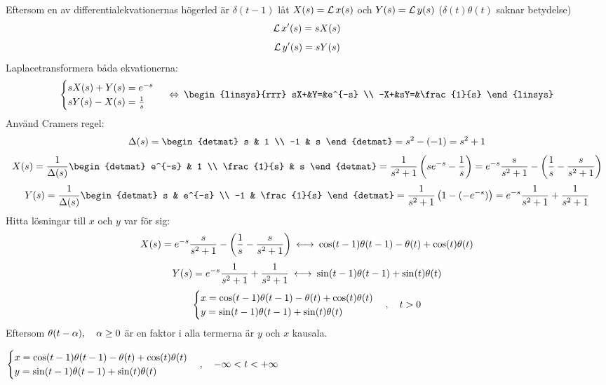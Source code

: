 \pagebreak
\begin{task}{5.16}
	Eftersom en av differentialekvationernas högerled är $\delta(t-1)$ låt $X(s)=\operatorname{\mathcal{L}} x(s)$ och $Y(s)=\operatorname{\mathcal{L}} y(s)$ ($\delta(t)\theta(t)$ saknar betydelse)
	\[\operatorname{\mathcal{L}} x'(s)=sX(s)\]
	\[\operatorname{\mathcal{L}} y'(s)=sY(s)\]
	Laplacetransformera båda ekvationerna:
	\[
	\begin{cases}
	sX(s)+Y(s)=e^{-s} \\
	sY(s)-X(s)=\frac{1}{s}
	\end{cases} \lra
	\begin{linsys}{rrr}
	sX+&Y=&e^{-s} \\
	-X+&sY=&\frac{1}{s}
	\end{linsys}\]
	Använd Cramers regel:
	\begin{align*}
	\Delta(s)=\begin{detmat}
	s & 1 \\
	-1 & s
	\end{detmat}=
	s^2-(-1)=
	s^2+1
	\end{align*}
	\begin{align*}
	X(s)=
	\frac{1}{\Delta(s)}\begin{detmat}
	e^{-s} & 1 \\
	\frac{1}{s} & s
	\end{detmat}=
	\frac{1}{s^2+1}\left(se^{-s}-\frac{1}{s}\right)=
	e^{-s}\frac{s}{s^2+1}-\left(\frac{1}{s}-\frac{s}{s^2+1}\right)
	\end{align*}
	\begin{align*}
	Y(s)=
	\frac{1}{\Delta(s)}\begin{detmat}
	s & e^{-s} \\
	-1 & \frac{1}{s}
	\end{detmat}=
	\frac{1}{s^2+1}\left(1-(-e^{-s})\right)=
	e^{-s}\frac{1}{s^2+1}+\frac{1}{s^2+1}
	\end{align*}
	Hitta lösningar till $x$ och $y$ var för sig: 
	\begin{align*}
	X(s)=
	e^{-s}\frac{s}{s^2+1}-\left(\frac{1}{s}-\frac{s}{s^2+1}\right)\llra
	\cos(t-1)\theta(t-1)-\theta(t)+\cos(t)\theta(t)
	\end{align*}
	\begin{align*}
	Y(s)=
	e^{-s}\frac{1}{s^2+1}+\frac{1}{s^2+1} \llra
	\sin(t-1)\theta(t-1)+\sin(t)\theta(t)
	\end{align*}
	\[\begin{cases}
	x=\cos(t-1)\theta(t-1)-\theta(t)+\cos(t)\theta(t) \\
	y=\sin(t-1)\theta(t-1)+\sin(t)\theta(t)
	\end{cases}, \quad t > 0\]
	Eftersom $\theta(t-\alpha), \quad \alpha\ge 0$ är en faktor i alla termerna är $y$ och $x$ kausala.
	
	\ans
	$\begin{cases}
	x=\cos(t-1)\theta(t-1)-\theta(t)+\cos(t)\theta(t) \\
	y=\sin(t-1)\theta(t-1)+\sin(t)\theta(t)
	\end{cases}, \quad -\infty < t < +\infty$
\end{task}

